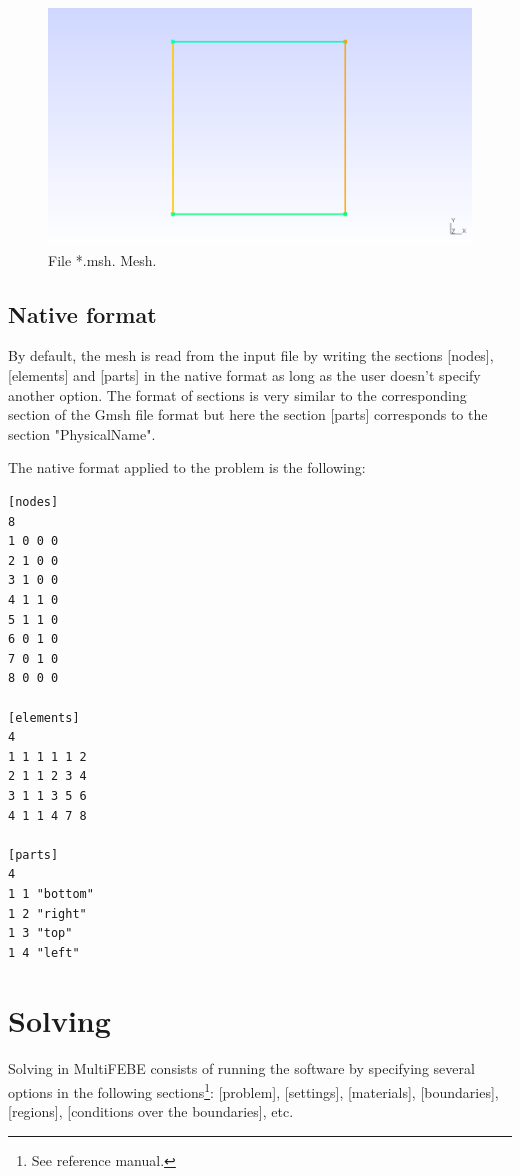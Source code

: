 \documentclass[A4]{article}
\begin{document}
\begin{figure}[h]
	\centering
	\includegraphics[scale = 0.5]{mesh.png}
	\caption{File *.msh. Mesh.}
	\label{fig:mesh}
\end{figure}

\subsection{Native format}

By default, the mesh is read from the input file by writing the sections [nodes], [elements] and [parts] in the native format as long as the user doesn't specify another option. The format of sections is very similar to the corresponding section of the Gmsh file format but here the section [parts] corresponds to the section "PhysicalName".

The native format applied to the problem is the following:

\begin{Verbatim}
[nodes]
8
1 0 0 0
2 1 0 0
3 1 0 0
4 1 1 0
5 1 1 0
6 0 1 0
7 0 1 0
8 0 0 0

[elements]
4
1 1 1 1 1 2
2 1 1 2 3 4
3 1 1 3 5 6
4 1 1 4 7 8

[parts]
4
1 1 "bottom"
1 2 "right"
1 3 "top"
1 4 "left"
\end{Verbatim}

\section{Solving}

Solving in MultiFEBE consists of running the software by specifying several options in the following sections\footnote{See reference manual.}: [problem], [settings], [materials], [boundaries], [regions], [conditions over the boundaries], etc.
\end{document}
